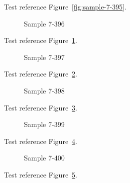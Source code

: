 Test reference Figure~\ref{fig:sample-7-395}.

\begin{figure}[tbhp]
\caption{Sample 7-396}
\label{fig:sample-7-396}
\end{figure}

Test reference Figure~\ref{fig:sample-7-396}.

\begin{figure}[tbhp]
\caption{Sample 7-397}
\label{fig:sample-7-397}
\end{figure}

Test reference Figure~\ref{fig:sample-7-397}.

\begin{figure}[tbhp]
\caption{Sample 7-398}
\label{fig:sample-7-398}
\end{figure}

Test reference Figure~\ref{fig:sample-7-398}.

\begin{figure}[tbhp]
\caption{Sample 7-399}
\label{fig:sample-7-399}
\end{figure}

Test reference Figure~\ref{fig:sample-7-399}.

\begin{figure}[tbhp]
\caption{Sample 7-400}
\label{fig:sample-7-400}
\end{figure}

Test reference Figure~\ref{fig:sample-7-400}.


